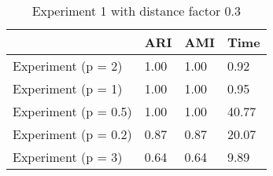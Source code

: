 \begin{table}
\centering
\caption{Experiment 1 with distance factor 0.3}
\begin{tabular}{llll}
\toprule
{} &   ARI &   AMI &   Time \\
\midrule
Experiment (p = 2)   &  1.00 &  1.00 &   0.92 \\
Experiment (p = 1)   &  1.00 &  1.00 &   0.95 \\
Experiment (p = 0.5) &  1.00 &  1.00 &  40.77 \\
Experiment (p = 0.2) &  0.87 &  0.87 &  20.07 \\
Experiment (p = 3)   &  0.64 &  0.64 &   9.89 \\
\bottomrule
\end{tabular}
\end{table}
